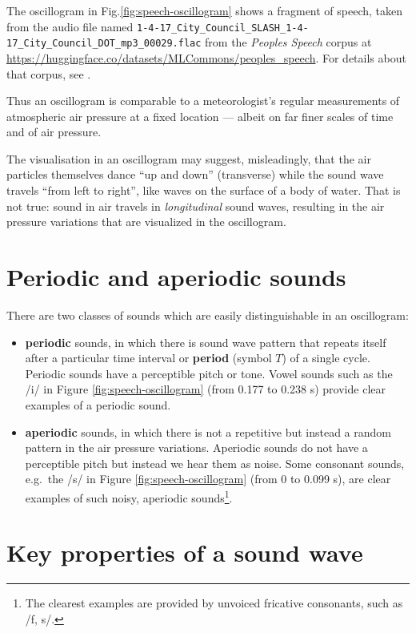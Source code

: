 \documentclass[
]{book}
\begin{document}
\label{box-speechfile-details}
The oscillogram in Fig.\ref{fig:speech-oscillogram} shows a fragment of speech, taken from the audio file named \texttt{1-4-17\_City\_Council\_SLASH\_1-4-17\_City\_Council\_DOT\_mp3\_00029.flac} from the \emph{Peoples Speech} corpus at \url{https://huggingface.co/datasets/MLCommons/peoples_speech}. For details about that corpus, see \citet{Galvez_Diamos_Ciro_Cerón_Achorn_Gopi_Kanter_Lam_Mazumder_Reddi_2021}.

Thus an oscillogram is comparable to a meteorologist's regular measurements of atmospheric air pressure at a fixed location --- albeit on far finer scales of time and of air pressure.

The visualisation in an oscillogram may suggest, misleadingly, that the air particles themselves dance ``up and down'' (transverse) while the sound wave travels ``from left to right'', like waves on the surface of a body of water. That is not true: sound in air travels in \emph{longitudinal} sound waves, resulting in the air pressure variations that are visualized in the oscillogram.

\section{Periodic and aperiodic sounds}\label{sec:periodicity}

There are two classes of sounds which are easily distinguishable in an oscillogram:

\begin{itemize}
\item
  \textbf{periodic} sounds, in which there is sound wave pattern that repeats itself after a particular time interval or \textbf{period} (symbol \(T\)) of a single cycle. Periodic sounds have a perceptible pitch or tone. Vowel sounds such as the /i/ in Figure \ref{fig:speech-oscillogram} (from 0.177 to 0.238 s) provide clear examples of a periodic sound.
\item
  \textbf{aperiodic} sounds, in which there is not a repetitive but instead a random pattern in the air pressure variations. Aperiodic sounds do not have a perceptible pitch but instead we hear them as noise. Some consonant sounds, e.g.~the /s/ in Figure \ref{fig:speech-oscillogram} (from 0 to 0.099 s), are clear examples of such noisy, aperiodic sounds\footnote{The clearest examples are provided by unvoiced fricative consonants, such as /f, s/.}.
\end{itemize}

\section{Key properties of a sound wave}\label{sec:keypropertiessound}
\end{document}
